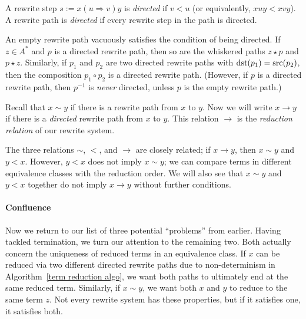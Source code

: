 \documentclass[../generics]{subfiles}
\begin{document}
\begin{definition}
A rewrite step $s := x(u\Rightarrow v)y$ is \emph{directed} if $v<u$ (or equivalently, $xuy<xvy$). A rewrite path is \emph{directed} if every rewrite step in the path is directed.
\end{definition}
An empty rewrite path vacuously satisfies the condition of being directed. If $z\in A^*$ and $p$ is a directed rewrite path, then so are the whiskered paths $z\star p$ and $p\star z$. Similarly, if $p_1$ and $p_2$ are two directed rewrite paths with $\operatorname{dst}(p_1)=\operatorname{src}(p_2)$, then the composition $p_1\circ p_2$ is a directed rewrite path. (However, if $p$ is a directed rewrite path, then $p^{-1}$ is \emph{never} directed, unless $p$ is the empty rewrite path.)
\begin{definition}
Recall that $x\sim y$ if there is a rewrite path from $x$ to $y$. Now we will write $x\rightarrow y$ if there is a \emph{directed} rewrite path from $x$ to $y$. This relation \index{$\rightarrow$}$\rightarrow$ is the \emph{reduction relation} of our rewrite system.
\end{definition}

The three relations $\sim$, $<$, and $\rightarrow$ are closely related; if $x\rightarrow y$, then $x\sim y$ and $y<x$. However, $y<x$ does not imply $x\sim y$; we can compare terms in different equivalence classes with the reduction order. We will also see that $x\sim y$ and $y<x$ together do not imply $x\rightarrow y$ without further conditions.

\paragraph{Confluence}
Now we return to our list of three potential ``problems'' from earlier. Having tackled termination, we turn our attention to the remaining two. Both actually concern the uniqueness of reduced terms in an equivalence class. If $x$ can be reduced via two different directed rewrite paths due to non-determinism in Algorithm~\ref{term reduction algo}, we want both paths to ultimately end at the same reduced term. Similarly, if $x\sim y$, we want both $x$ and $y$ to reduce to the same term $z$. Not every rewrite system has these properties, but if it satisfies one, it satisfies both.
\end{document}
